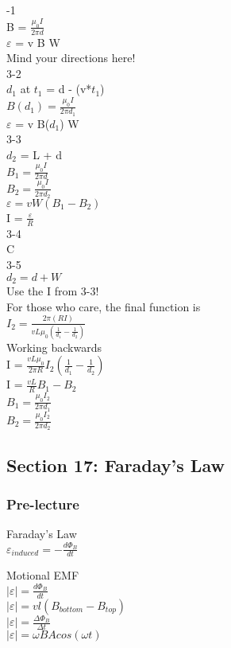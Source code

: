 \documentclass{article}
\begin{document}
-1 \\
B = $\frac{\mu_0 I}{2 \pi d}$ \\
$\varepsilon$ = v B W \\
Mind your directions here! \\
3-2 \\
$d_1$ at $t_1$ = d - (v*$t_1$) \\
$B(d_1) = \frac{\mu_0 I}{2 \pi d_1}$ \\
$\varepsilon$ = v B($d_1$) W \\
3-3 \\
$d_2$ = L + d \\
$B_1 = \frac{\mu_0 I}{2 \pi d}$ \\
$B_2 = \frac{\mu_0 I}{2 \pi d_2}$ \\
$\varepsilon = vW(B_1 - B_2)$ \\
I = $\frac{\varepsilon}{R}$ \\
3-4 \\
C \\
3-5 \\
$d_2 = d + W$ \\
Use the I from 3-3! \\
For those who care, the final function is \\
$I_2 = \frac{2 \pi (R I)}{v L \mu_0 (\frac{1}{d_1} - \frac{1}{d_2})}$ \\
Working backwards \\
I = $\frac{v L \mu_0}{2 \pi R} I_2 (\frac{1}{d_1} - \frac{1}{d_2})$ \\
I = $\frac{v L}{R} B_1 - B_2$ \\
$B_1 = \frac{\mu_0 I_2}{2 \pi d_1}$ \\
$B_2 = \frac{\mu_0 I_2}{2 \pi d_2}$

\subsection{Section 17: Faraday's Law}
\subsubsection{Pre-lecture}
\noindent
Faraday's Law \\
$\varepsilon_{induced} = - \frac{d \Phi_B}{dt} $

\vspace{2mm}

\noindent
Motional EMF \\
$\vert \varepsilon \vert = \frac{d \Phi_B}{dt}$ \\
$\vert \varepsilon \vert = vl(B_{bottom} - B_{top})$ \\
$\vert \varepsilon \vert = \frac{\Delta \Phi_B}{\Delta t}$ \\
$\vert \varepsilon \vert = \omega B A cos(\omega t)$
\end{document}
